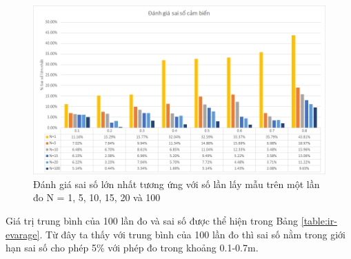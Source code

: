 \begin{figure}[htbp]
    \centering
    \includegraphics[width=\textwidth]{figures/chart_IReval_MaxPercent.png}
    \caption[Đánh giá sai số lớn nhất tương ứng với số lần lấy mẫu]{Đánh giá sai số lớn nhất tương ứng với số lần lấy mẫu trên một lần đo N = 1, 5, 10, 15, 20 và 100}
    \label{chart:IR-eval-NumSample}
\end{figure}

 Giá trị trung bình của 100 lần đo và sai số được thể hiện trong Bảng \ref{table:ir-evarage}. Từ đây ta thấy với trung bình của 100 lần đo thì sai số nằm trong giới hạn sai số cho phép 5\% với phép đo trong khoảng 0.1-0.7m.

